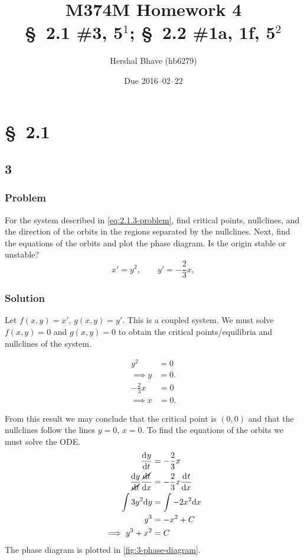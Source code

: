 \documentclass[12pt]{article}
\title{M374M Homework 4 \\
  \normalsize{\S~2.1 \#3, 5$^1$; \S~2.2 \#1a, 1f, 5$^2$}}
\author{Hershal Bhave (hb6279)}
\date{Due 2016--02--22}
\begin{document}
\maketitle
\section{\S~2.1}
\subsection{3}
\subsubsection*{Problem}
For the system described in \cref{eq:2.1.3-problem}, find critical points,
nullclines, and the direction of the orbits in the regions separated by the
nullclines. Next, find the equations of the orbits and plot the phase diagram.
Is the origin stable or unstable?
\begin{equation}
  \label{eq:2.1.3-problem}
  x'=y^2, \qquad y'=-\frac{2}{3}x,
\end{equation}
\subsubsection*{Solution}
Let $f(x,y) = x'$, $g(x,y) = y'$. This is a coupled system. We must solve
$f(x,y)=0$ and $g(x,y)=0$ to obtain the critical points/equilibria and
nullclines of the system.
\begin{multicols}{2}
  \begin{equation*}
    \begin{aligned}
      y^2 &= 0 \\
      \implies y &= 0.
    \end{aligned}
  \end{equation*}
  \begin{equation*}
    \begin{aligned}
      -\frac{2}{3}x &= 0 \\
      \implies x &= 0.
    \end{aligned}
  \end{equation*}
\end{multicols} \noindent
From this result we may conclude that the critical point is $(0,0)$ and that the
nullclines follow the lines $y=0$, $x=0$. To find the equations of the orbits we
must solve the ODE\@.
\begin{equation}
  \begin{aligned}
    \frac{\mathrm{d}^{} {y}}{\mathrm{d}{t}^{}} &= -\frac{2}{3}x \\
    \frac{\mathrm{d}{y}}{\cancel{\mathrm{d}{t}}} \frac{\cancel{\mathrm{d}{t}}}{\mathrm{d}{x}} &=
    -\frac{2}{3}x \frac{\mathrm{d}^{} {t}}{\mathrm{d}{x}^{}} \\
    \int 3y^2 \mathrm{d}{y} &= \int -2x^2 \mathrm{d}{x} \\
    y^3 &= -x^2 + C \\
    \implies y^3 + x^2 &= C
  \end{aligned}
\end{equation}
The phase diagram is plotted in \cref{fig:3-phase-diagram}.
\end{document}
